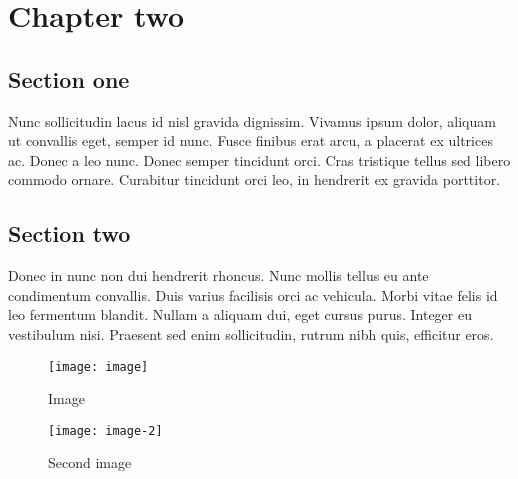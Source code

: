 \chapter{Chapter two}

\section{Section one}
Nunc sollicitudin lacus id nisl gravida dignissim. Vivamus ipsum dolor, aliquam ut convallis eget, semper id nunc. Fusce finibus erat arcu, a placerat ex ultrices ac. Donec a leo nunc. Donec semper tincidunt orci. Cras tristique tellus sed libero commodo ornare. Curabitur tincidunt orci leo, in hendrerit ex gravida porttitor.

\section{Section two}
Donec in nunc non dui hendrerit rhoncus. Nunc mollis tellus eu ante condimentum convallis. Duis varius facilisis orci ac vehicula. Morbi vitae felis id leo fermentum blandit. Nullam a aliquam dui, eget cursus purus. Integer eu vestibulum nisi. Praesent sed enim sollicitudin, rutrum nibh quis, efficitur eros.

\begin{figure}[H]
    \centering
    \texttt{[image: image]}
    \caption{Image}
    \label{fig:image}
\end{figure}

\begin{figure}[H]
    \centering
    \texttt{[image: image-2]}
    \caption{Second image}
    \label{fig:image-2}
\end{figure}
